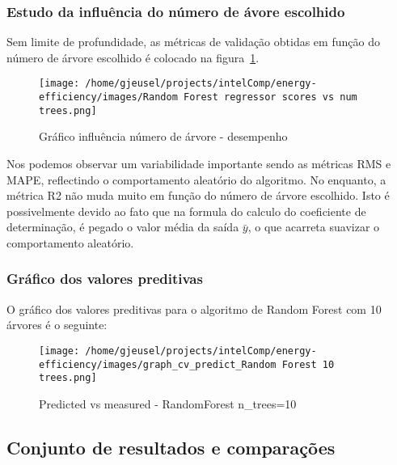 \documentclass[paper=a4, fontsize=11pt]{article} %
\numberwithin{equation}{section} %
\numberwithin{figure}{section} %
\numberwithin{table}{section} %
\begin{document}
\subsubsection{Estudo da influência do número de ávore escolhido}

Sem limite de profundidade, as métricas de validação obtidas em função do número de árvore escolhido é colocado na figura~\ref{graph_inf_numtree}.\newline

\begin{figure}[H] %
\begin{center}
\texttt{[image: /home/gjeusel/projects/intelComp/energy-efficiency/images/Random Forest regressor scores vs num trees.png]}
\caption{Gráfico influência número de árvore - desempenho}
\label{graph_inf_numtree}
\end{center}
\end{figure}

Nos podemos observar um variabilidade importante sendo as métricas RMS e MAPE, reflectindo o comportamento aleatório do algoritmo.
No enquanto, a métrica R2 não muda muito em função do número de árvore escolhido.
Isto é possivelmente devido ao fato que na formula do calculo do coeficiente de determinação,
é pegado o valor média da saída $\bar{y}$, o que acarreta suavizar o comportamento aleatório.

\subsubsection{Gráfico dos valores preditivas}

O gráfico dos valores preditivas para o algoritmo de Random Forest com 10 árvores é o seguinte:
\begin{figure}[H] %
\begin{center}
\texttt{[image: /home/gjeusel/projects/intelComp/energy-efficiency/images/graph\_cv\_predict\_Random Forest 10 trees.png]}
\end{center}
\caption{Predicted vs measured - RandomForest n\_trees=10}
\label{PvsM_RandomForest}
\end{figure}


\subsection{Conjunto de resultados e comparações}
\end{document}
